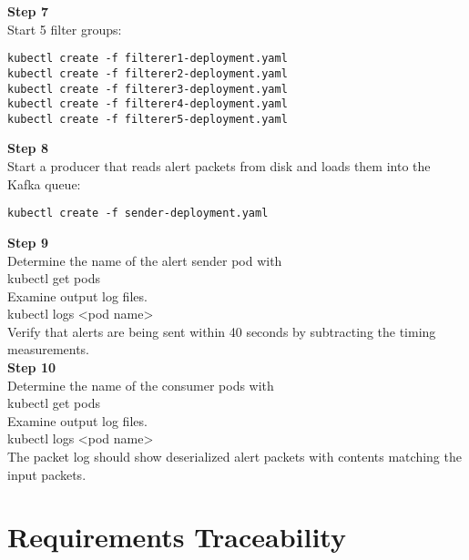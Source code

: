 \textbf{Step 7}\\
Start 5 filter groups:\\

\begin{verbatim}
kubectl create -f filterer1-deployment.yaml
kubectl create -f filterer2-deployment.yaml
kubectl create -f filterer3-deployment.yaml
kubectl create -f filterer4-deployment.yaml
kubectl create -f filterer5-deployment.yaml
\end{verbatim}

\textbf{Step 8}\\
Start a producer that reads alert packets from disk and loads them into
the Kafka queue:\\[2\baselineskip]

\begin{verbatim}
kubectl create -f sender-deployment.yaml
\end{verbatim}

\textbf{Step 9}\\
Determine the name of the alert sender pod with\\[2\baselineskip]kubectl
get pods\\[2\baselineskip]Examine output log
files.\\[2\baselineskip]kubectl logs \textless{}pod
name\textgreater{}\\[2\baselineskip]Verify that alerts are being sent
within 40 seconds by subtracting the timing
measurements.\\[2\baselineskip]\textbf{Step 10}\\
Determine the name of the consumer pods with\\[2\baselineskip]kubectl
get pods\\[2\baselineskip]Examine output log
files.\\[2\baselineskip]kubectl logs \textless{}pod
name\textgreater{}\\[2\baselineskip]The packet log should show
deserialized alert packets with contents matching the input
packets.\\[2\baselineskip]

\section{Requirements Traceability}\label{requirements-traceability}


